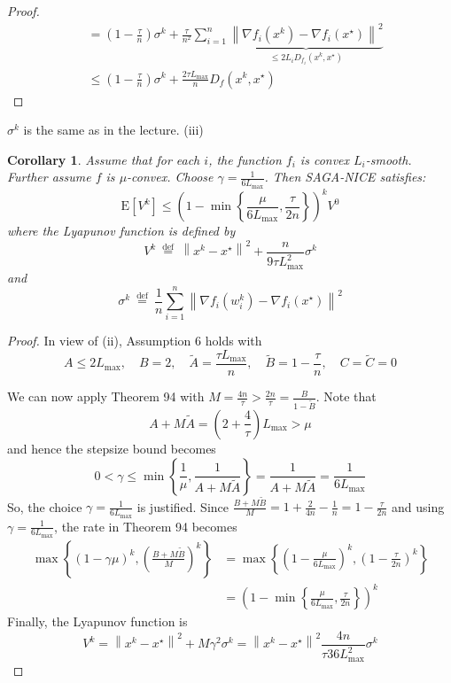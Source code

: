 \documentclass[12pt,a4paper]{article}
\newtheorem*{corollary}{Corollary}
\begin{document}
\begin{proof}
$$\begin{aligned}
	&=\left(1-\frac{\tau}{n}\right) \sigma^{k}+\frac{\tau}{n^{2}} \sum_{i=1}^{n} \underbrace{\left\|\nabla f_{i}\left(x^{k}\right)-\nabla f_{i}\left(x^{\star}\right)\right\|^{2}}_{\leq 2 L_{i} D_{f_{i}}\left(x^{k}, x^{\star}\right)} \\
	& \leq\left(1-\frac{\tau}{n}\right) \sigma^{k}+\frac{2\tau L_{\max }}{n} D_{f}\left(x^{k}, x^{\star}\right)
\end{aligned}
$$
	\end{proof}
	$\sigma^k$ is the same as in the lecture.
	\newline
	(iii)
	\begin{corollary}
		Assume that for each $i$, the function $f_{i}$ is convex $L_{i}$-smooth. Further assume $f$ is $\mu$-convex. Choose $\gamma=\frac{1}{6 L_{\max }}$. Then SAGA-NICE satisfies:
		$$
		\mathrm{E}\left[V^{k}\right] \leq\left(1-\min \left\{\frac{\mu}{6 L_{\max }}, \frac{\tau}{2 n}\right\}\right)^{k} V^{0}
		$$
		where the Lyapunov function is defined by
		$$
		V^{k} \stackrel{\text { def }}{=}\left\|x^{k}-x^{\star}\right\|^{2}+\frac{n}{9\tau L_{\max }^{2}} \sigma^{k}
		$$
		and
		$$
		\sigma^{k} \stackrel{\text { def }}{=} \frac{1}{n} \sum_{i=1}^{n}\left\|\nabla f_{i}\left(w_{i}^{k}\right)-\nabla f_{i}\left(x^{\star}\right)\right\|^{2}
		$$
	\end{corollary}
\begin{proof}
	In view of (ii), Assumption 6 holds with
	$$
	A\leq 2 L_{\max }, \quad B=2, \quad \tilde{A}=\frac{\tau L_{\max }}{n}, \quad \tilde{B}=1-\frac{\tau}{n}, \quad C=\tilde{C}=0
	$$
	
	We can now apply Theorem 94 with $M=\frac{4n}{\tau}>\frac{2n}{\tau}=\frac{B}{1-\tilde{B}} .$ Note that
	$$
	A+M \tilde{A}=(2+\frac{4}{\tau}) L_{\max }>\mu
	$$
	and hence the stepsize bound becomes
	$$
	0<\gamma \leq \min \left\{\frac{1}{\mu}, \frac{1}{A+M \tilde{A}}\right\}=\frac{1}{A+M \tilde{A}}=\frac{1}{6 L_{\max }}
	$$
	So, the choice $\gamma=\frac{1}{6 L_{\max }}$ is justified. Since $\frac{B+M \tilde{B}}{M}=1+\frac{2}{4 n}-\frac{1}{n}=1-\frac{\tau}{2 n}$ and using $\gamma=\frac{1}{6 L_{\max }}$, the rate in Theorem 94 becomes
	$$
	\begin{aligned}
		\max \left\{(1-\gamma \mu)^{k},\left(\frac{B+M \tilde{B}}{M}\right)^{k}\right\} &=\max \left\{\left(1-\frac{\mu}{6 L_{\max }}\right)^{k},\left(1-\frac{\tau}{2 n}\right)^{k}\right\} \\
		&=\left(1-\min \left\{\frac{\mu}{6 L_{\max }}, \frac{\tau}{2 n}\right\}\right)^{k}
	\end{aligned}
	$$
	Finally, the Lyapunov function is
	$$
	V^{k}=\left\|x^{k}-x^{\star}\right\|^{2}+M \gamma^{2} \sigma^{k}=\left\|x^{k}-x^{\star}\right\|^{2} \frac{4 n}{\tau36 L_{\max }^{2}} \sigma^{k}
	$$
\end{proof}
\end{document}
